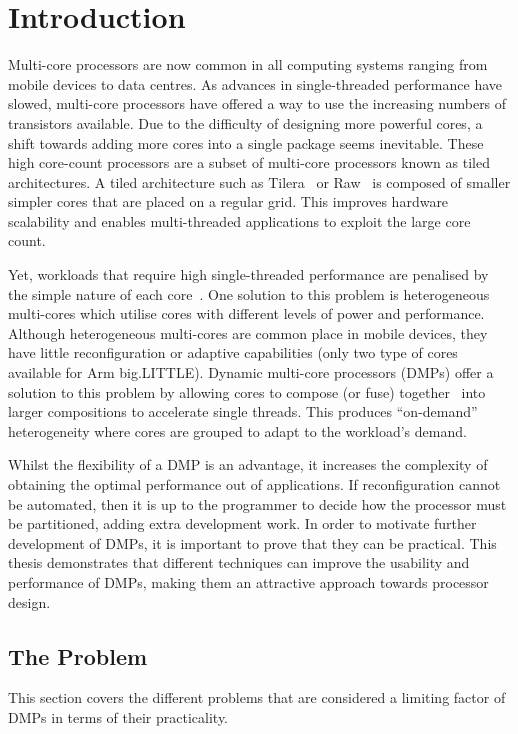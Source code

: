 \chapter{Introduction}
\vspace{-1em}
Multi-core processors are now common in all computing systems ranging from mobile devices to data centres.
As advances in single-threaded performance have slowed, multi-core processors have offered a way to use the increasing numbers of transistors available.
Due to the difficulty of designing more powerful cores, a shift towards adding more cores into a single package seems inevitable.
These high core-count processors are a subset of multi-core processors known as tiled architectures.
A tiled architecture such as Tilera~\cite{bell2008tile} or Raw~\cite{waingold1997raw} is composed of smaller simpler cores that are placed on a regular grid.
This improves hardware scalability and enables multi-threaded applications to exploit the large core count.

Yet, workloads that require high single-threaded performance are penalised by the simple nature of each core~\cite{eyerman2010amdahl}.
One solution to this problem is heterogeneous multi-cores which utilise cores with different levels of power and performance.
Although heterogeneous multi-cores are common place in mobile devices, they have little reconfiguration or adaptive capabilities (\eg only two type of cores available for Arm big.LITTLE).
Dynamic multi-core processors (DMPs) offer a solution to this problem by allowing cores to compose (or fuse) together~\cite{ipek2007CoreFusion} into larger compositions to accelerate single threads.
This produces ``on-demand'' heterogeneity where cores are grouped to adapt to the workload's demand.

Whilst the flexibility of a DMP is an advantage, it increases the complexity of obtaining the optimal performance out of applications.
If reconfiguration cannot be automated, then it is up to the programmer to decide how the processor must be partitioned, adding extra development work.
In order to motivate further development of DMPs, it is important to prove that they can be practical.
This thesis demonstrates that different techniques can improve the usability and performance of DMPs, making them an attractive approach towards processor design. 

\section{The Problem}
This section covers the different problems that are considered a limiting factor of DMPs in terms of their practicality.
